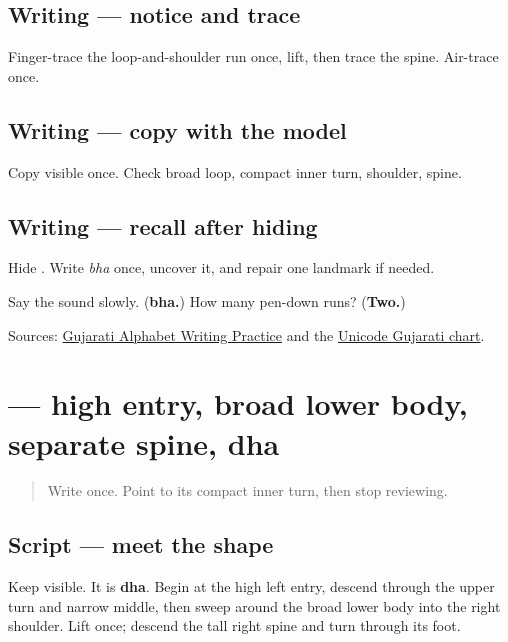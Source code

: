 \subsection*{Writing — notice and trace}

Finger-trace the loop-and-shoulder run once, lift, then trace the spine. Air-trace once.

\subsection*{Writing — copy with the model}
Copy visible \textbf{} once. Check broad loop, compact inner turn, shoulder, spine.

\subsection*{Writing — recall after hiding}
Hide \textbf{}. Write \emph{bha} once, uncover it, and repair one landmark if needed.

\begin{tcolorbox}[breakable,colback=teal!4,colframe=teal!35!black,title={Before you move on}]
Say the sound slowly. (\textbf{bha.}) How many pen-down runs? (\textbf{Two.})

Sources: \href{https://www.t30apps.com/gujarati-alphabet-writing/}{Gujarati Alphabet Writing Practice} and the \href{https://www.unicode.org/charts/PDF/U0A80.pdf}{Unicode Gujarati chart}.
\end{tcolorbox}
\section[\texorpdfstring{\gu{ધ} (dha)}{ધ (dha)}]{ — high entry, broad lower body, separate spine, dha}

\label{lesson:GU-W02-dha}



\begin{quote}
Write \textbf{} once. Point to its compact inner turn, then stop reviewing.
\end{quote}

\subsection*{Script — meet the shape}
Keep \textbf{} visible. It is \textbf{dha}. Begin at the high left entry, descend through the upper turn and narrow middle, then sweep around the broad lower body into the right shoulder. Lift once; descend the tall right spine and turn through its foot.

